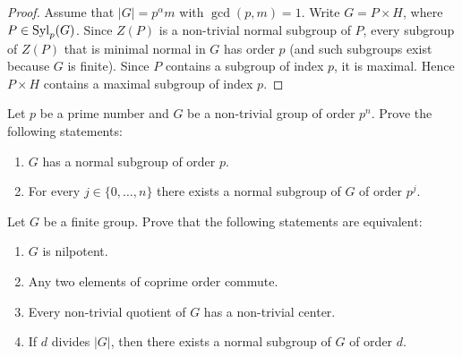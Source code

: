\begin{proof}
Assume that $|G|=p^{\alpha}m$ with $\gcd(p,m)=1$. 
Write $G=P\times H$, where $P\in\mathrm{Syl}_p(G)$.  Since $Z(P)$ is a non-trivial normal subgroup of
$P$, every subgroup of $Z(P)$ that is minimal normal in $G$ has order $p$ (and such subgroups exist because $G$ is finite). Since $P$ contains a subgroup of index $p$, 
it is maximal. Hence $P\times H$ contains 
a maximal subgroup of index $p$.
\end{proof}

\begin{exercise}
\label{xca:pgrupos}
Let $p$ be a prime number and $G$ be a non-trivial group 
of order $p^n$.
Prove the following statements:
\begin{enumerate}
	\item $G$ has a normal subgroup of order $p$.
	\item For every $j\in\{0,\dots,n\}$ there exists a normal subgroup 
            of $G$ of order $p^j$. 
\end{enumerate}
\end{exercise}


\begin{exercise}
\label{xca:nilpotente_equivalencia}
Let $G$ be a finite group. Prove that the following statements are equivalent:
\begin{enumerate}
	\item $G$ is nilpotent.
	\item Any two elements of coprime order commute. 
 	\item Every non-trivial quotient of $G$ has a non-trivial center.
	\item If $d$ divides $|G|$, then there exists a normal subgroup of $G$ of order $d$. 
 \end{enumerate}
\end{exercise}


